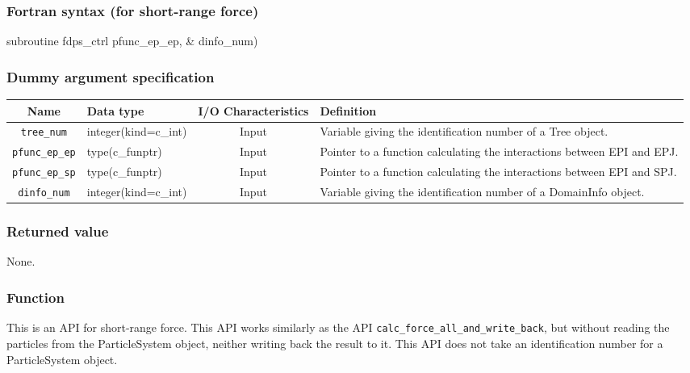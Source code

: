 \subsubsection*{Fortran syntax (for short-range force)}
\begin{screen}
\begin{spverbatim}
subroutine fdps_ctrl%
                                            pfunc_ep_ep, &
                                            dinfo_num)
\end{spverbatim}
\end{screen}

\subsubsection*{Dummy argument specification}
\begin{table}[h]
\begin{tabularx}{\linewidth}{clcX}
\toprule
\rowcolor{Snow2}
Name & Data type & I/O Characteristics & Definition \\
\midrule
\verb|tree_num|    & integer(kind=c\_int)   & Input     & Variable giving the identification number of a Tree object. \\
\verb|pfunc_ep_ep| & type(c\_funptr)        & Input     & Pointer to a function calculating the interactions between EPI and EPJ. \\
\verb|pfunc_ep_sp| & type(c\_funptr)        & Input     & Pointer to a function calculating the interactions between EPI and SPJ. \\
\verb|dinfo_num|   & integer(kind=c\_int)   & Input     & Variable giving the identification number of a DomainInfo object. \\
\bottomrule
\end{tabularx}
\end{table}

\subsubsection*{Returned value}
None.

\subsubsection*{Function}
This is an API for short-range force. This API works similarly as the API \texttt{calc\_force\_all\_and\_write\_back}, but without reading the particles from the ParticleSystem object, neither writing back the result to it. This API does not take an identification number for a ParticleSystem object.
\clearpage

